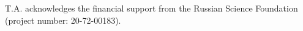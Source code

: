 T.A. acknowledges the financial support from the Russian Science Foundation (project number: 20-72-00183).